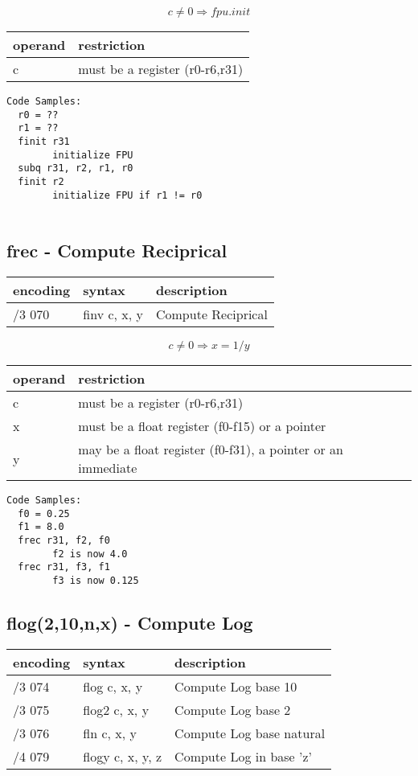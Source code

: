 \documentclass[letterpaper,10pt,openright,twoside,onecolumn]{book}
\begin{document}
  \begin{displaymath} c \neq 0 \Rightarrow fpu.init\end{displaymath}

  \flushleft
  \begin{tabular}{|l|l|}
   \hline
    operand & restriction \\
   \hline
    c & must be a register (r0-r6,r31) \\
   \hline
  \end{tabular}

  \begin{verbatim}
Code Samples:
  r0 = ??
  r1 = ??
  finit r31
        initialize FPU
  subq r31, r2, r1, r0
  finit r2
        initialize FPU if r1 != r0
  
  \end{verbatim}
\newpage\subsection{frec - Compute Reciprical}
  \begin{tabular}{|l|l|l|}
   \hline
    encoding & syntax & description \\
   \hline
    /3 070 & finv c, x, y & Compute Reciprical \\
   \hline
  \end{tabular}

  \begin{displaymath} c \neq 0 \Rightarrow x = 1 / y\end{displaymath}

  \flushleft
  \begin{tabular}{|l|l|}
   \hline
    operand & restriction \\
   \hline
    c & must be a register (r0-r6,r31) \\
    x & must be a float register (f0-f15) or a pointer \\
    y & may be a float register (f0-f31), a pointer or an immediate \\
   \hline
  \end{tabular}

  \begin{verbatim}
Code Samples:
  f0 = 0.25
  f1 = 8.0
  frec r31, f2, f0
        f2 is now 4.0
  frec r31, f3, f1
        f3 is now 0.125
  \end{verbatim}
\newpage\subsection{flog(2,10,n,x) - Compute Log}
  \begin{tabular}{|l|l|l|}
   \hline
    encoding & syntax & description \\
   \hline
    /3 074 & flog c, x, y & Compute Log base 10 \\
    /3 075 & flog2 c, x, y & Compute Log base 2 \\
    /3 076 & fln c, x, y & Compute Log base natural \\
    /4 079 & flogy c, x, y, z & Compute Log in base 'z' \\
   \hline
  \end{tabular}
\end{document}
